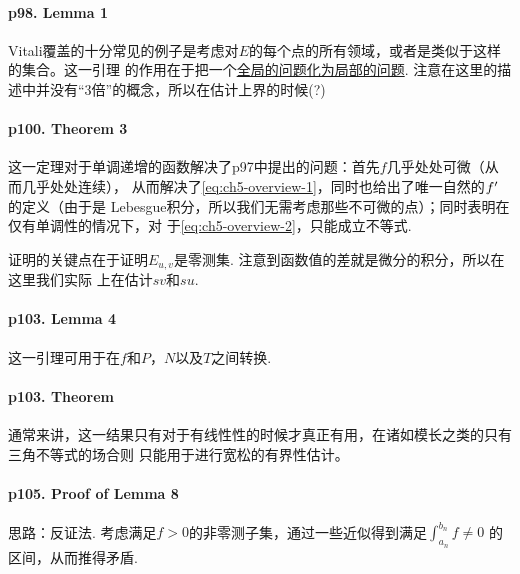   \paragraph{p98. Lemma 1}
    Vitali覆盖的十分常见的例子是考虑对$E$的每个点的所有领域，或者是类似于这样的集合。这一引理
    的作用在于把一个\href{https://www.quora.com/
    What-is-the-significance-of-the-Vitali-covering-lemma}
    {全局的问题化为局部的问题}. 注意在这里的描述中并没有“3倍”的概念，所以在估计上界的时候(?)

  \paragraph{p100. Theorem 3}
    这一定理对于单调递增的函数解决了p97中提出的问题：首先$f$几乎处处可微（从而几乎处处连续），
    从而解决了\eqref{eq:ch5-overview-1}，同时也给出了唯一自然的$f^\prime$的定义（由于是
    Lebesgue积分，所以我们无需考虑那些不可微的点）；同时表明在仅有单调性的情况下，对
    于\eqref{eq:ch5-overview-2}，只能成立不等式. \par
    证明的关键点在于证明$E_{u,v}$是零测集. 注意到函数值的差就是微分的积分，所以在这里我们实际
    上在估计$sv$和$su$. 

  \paragraph{p103. Lemma 4}
    这一引理可用于在$f$和$P$，$N$以及$T$之间转换. 

  \paragraph{p103. Theorem}
    通常来讲，这一结果只有对于有线性性的时候才真正有用，在诸如模长之类的只有三角不等式的场合则
    只能用于进行宽松的有界性估计。
  
  \paragraph{p105. Proof of Lemma 8}
    思路：反证法. 考虑满足$f>0$的非零测子集，通过一些近似得到满足$\int_{a_n}^{b_n}f\ne 0$
    的区间，从而推得矛盾. 

